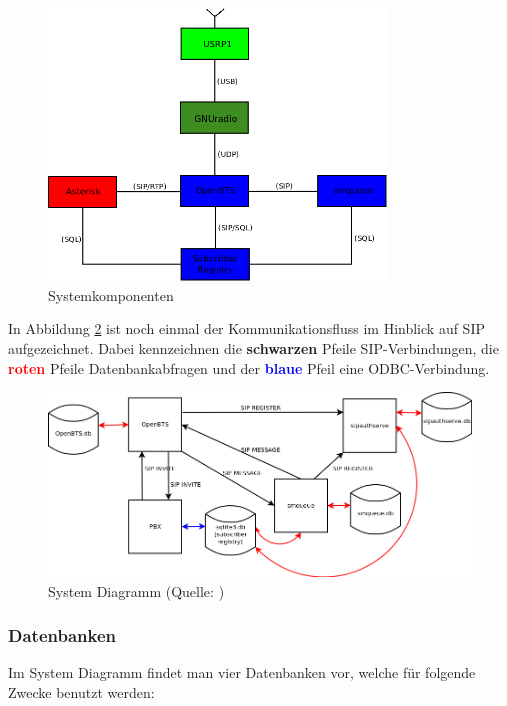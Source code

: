 \begin{figure}[htbp]
	\centering
		\includegraphics[width=0.80\textwidth]{img/openbts_comp.png}
	\caption{Systemkomponenten}
	\label{fig:openbts_comp}
\end{figure}


In Abbildung \ref{fig:openbts_system_diagram} ist noch einmal der Kommunikationsfluss im Hinblick auf SIP aufgezeichnet. Dabei kennzeichnen die \textbf{schwarzen} Pfeile SIP-Verbindungen, die \textcolor{red}{\textbf{roten}} Pfeile Datenbankabfragen und der \textcolor{blue}{\textbf{blaue}} Pfeil eine ODBC-Verbindung.

\begin{figure}[hbtp]
	\centering
		\includegraphics[width=1.00\textwidth]{img/openbts_system_diagram.png}
	\caption{System Diagramm (Quelle: \cite{bib:diagramm:openbts})}
	\label{fig:openbts_system_diagram}
\end{figure}

\subsubsection{Datenbanken}
Im System Diagramm findet man vier Datenbanken vor, welche für folgende Zwecke benutzt werden:

